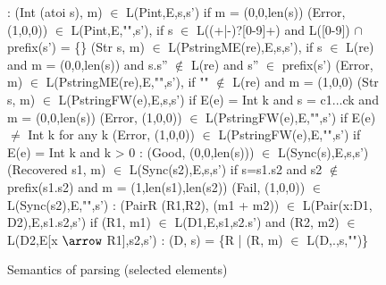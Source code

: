 \begin{figure}[t]
{\small
\begin{code}
\cdmath\small
{}:
(Int (atoi s), m) $\in$ L(Pint,E,s,s')
  if m = (0,0,len(s))
(Error, (1,0,0)) $\in$ L(Pint,E,"",s'), 
  if s $\in$ L((+|-)?[0-9]+) 
  and L([0-9]) $\cap$ prefix(s') = \{\}
(Str s, m) $\in$ L(PstringME(re),E,s,s'),
  if s $\in$ L(re) 
  and m = (0,0,len(s)) 
  and s.s'' $\not\in$ L(re) and s'' $\in$ prefix(s') 
(Error, m) $\in$ L(PstringME(re),E,"",s'), 
  if "" $\not\in$ L(re)
  and m = (1,0,0)
(Str s, m) $\in$ L(PstringFW(e),E,s,s') 
  if E(e) = Int k and s = c1...ck
  and m = (0,0,len(s))
(Error, (1,0,0)) $\in$ L(PstringFW(e),E,"",s') 
  if E(e) $\ne$ Int k for any k
(Error, (1,0,0)) $\in$ L(PstringFW(e),E,"",s') 
  if E(e) = Int k and k > 0
\mbox{}
:
(Good, (0,0,len(s))) $\in$ L(Sync(s),E,s,s')
(Recovered s1, m) $\in$ L(Sync(s2),E,s,s')
  if s=s1.s2 and s2 $\not\in$ prefix(s1.s2)
  and m = (1,len(s1),len(s2))
(Fail, (1,0,0)) $\in$ L(Sync(s2),E,"",s')
\mbox{}
:
(PairR (R1,R2), (m1 + m2)) 
        $\in$ L(Pair(x:D1, D2),E,s1.s2,s')
  if  (R1, m1) $\in$ L(D1,E,s1,s2.s')
  and (R2, m2) $\in$ L(D2,E[x $\arrow$ R1],s2,s')
\mbox{}
:
(D, s) = \{R | (R, m) $\in$ L(D,.,s,"")\} 
\end{code}
}
\caption{Semantics of parsing (selected elements)}
\label{fig:parse-sem}
\end{figure}







